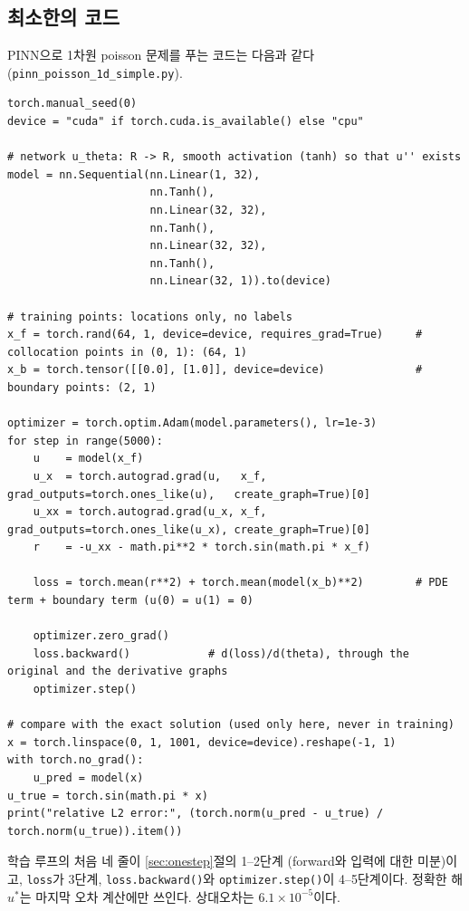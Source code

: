 \documentclass[11pt,a4paper]{article}
\begin{document}
\subsection{최소한의 코드}

PINN으로 1차원 poisson 문제를 푸는 코드는 다음과 같다 (\texttt{pinn\_poisson\_1d\_simple.py}).
\begin{lstlisting}
torch.manual_seed(0)
device = "cuda" if torch.cuda.is_available() else "cpu"

# network u_theta: R -> R, smooth activation (tanh) so that u'' exists
model = nn.Sequential(nn.Linear(1, 32),
                      nn.Tanh(),
                      nn.Linear(32, 32),
                      nn.Tanh(),
                      nn.Linear(32, 32),
                      nn.Tanh(),
                      nn.Linear(32, 1)).to(device)

# training points: locations only, no labels
x_f = torch.rand(64, 1, device=device, requires_grad=True)     # collocation points in (0, 1): (64, 1)
x_b = torch.tensor([[0.0], [1.0]], device=device)              # boundary points: (2, 1)

optimizer = torch.optim.Adam(model.parameters(), lr=1e-3)
for step in range(5000):
    u    = model(x_f)                                                                              
    u_x  = torch.autograd.grad(u,   x_f, grad_outputs=torch.ones_like(u),   create_graph=True)[0]  
    u_xx = torch.autograd.grad(u_x, x_f, grad_outputs=torch.ones_like(u_x), create_graph=True)[0]  
    r    = -u_xx - math.pi**2 * torch.sin(math.pi * x_f)                                          

    loss = torch.mean(r**2) + torch.mean(model(x_b)**2)        # PDE term + boundary term (u(0) = u(1) = 0)

    optimizer.zero_grad()
    loss.backward()            # d(loss)/d(theta), through the original and the derivative graphs
    optimizer.step()

# compare with the exact solution (used only here, never in training)
x = torch.linspace(0, 1, 1001, device=device).reshape(-1, 1)
with torch.no_grad():
    u_pred = model(x)
u_true = torch.sin(math.pi * x)
print("relative L2 error:", (torch.norm(u_pred - u_true) / torch.norm(u_true)).item())
\end{lstlisting}
학습 루프의 처음 네 줄이 \ref{sec:onestep}절의 1--2단계 (forward와 입력에 대한 미분)이고, \texttt{loss}가 3단계,
\texttt{loss.backward()}와 \texttt{optimizer.step()}이 4--5단계이다. 정확한 해 $u^*$는 마지막 오차 계산에만 쓰인다.
상대오차는 $6.1\times10^{-5}$이다.
\end{document}

